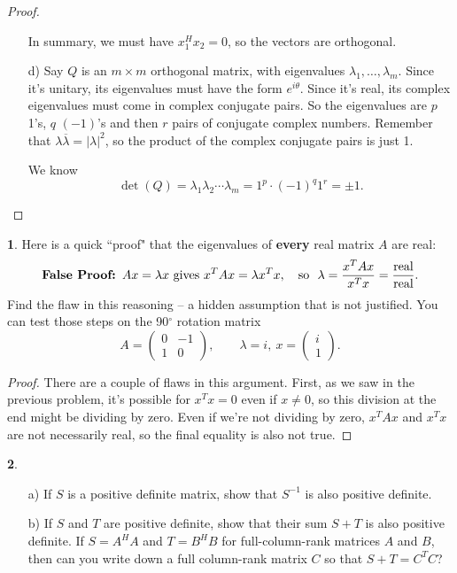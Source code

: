 \documentclass{article}
\theoremstyle{definition}
\newtheorem{prob}{}
\begin{document}
\begin{proof}
\begin{itemize}
	In summary, we must have $x_1^Hx_2=0$, so the vectors are orthogonal.
	
	\item[d)] Say $Q$ is an $m \times m$ orthogonal matrix, with eigenvalues $\lambda_1, \dots, \lambda_m$. Since it's unitary, its eigenvalues must have the form $e^{i \theta}$. Since it's real, its complex eigenvalues must come in complex conjugate pairs. So the eigenvalues are $p$ 1's, $q$ $(-1)$'s and then $r$ pairs of conjugate complex numbers. Remember that $\lambda \overline{\lambda}=|\lambda|^2$, so the product of the complex conjugate pairs is just 1.
	
	We know 
	\[\det(Q)= \lambda_1 \lambda_2 \cdots \lambda_m= 1^p \cdot (-1)^q 1^r= \pm1.\]
	\end{itemize}
\end{proof}

\begin{prob}
Here is a quick ``proof" that the eigenvalues of \textbf{every} real matrix $A$ are real:
\[\text{\textbf{False Proof: }} Ax = \lambda x \text{ gives } x^TAx = \lambda x^Tx, \quad \text{so } \ \lambda  = \frac{ x^TAx}{x^Tx} = \frac{\text{real}}{\text{real}}.\]
Find the flaw in this reasoning -- a hidden assumption that is not justified.  You can test those steps on the 90${}^\circ$ rotation matrix
\[ A = \begin{pmatrix} 0 & -1 \\  1 & 0 \end{pmatrix}, \qquad \lambda =  i, \ x = \begin{pmatrix} i \\ 1 \end{pmatrix}.\]
\end{prob}

\begin{proof}
There are a couple of flaws in this argument. First, as we saw in the previous problem, it's possible for $x^Tx=0$ even if $x \neq 0$, so this division at the end might be dividing by zero. Even if we're not dividing by zero, $x^TAx$ and $x^Tx$ are not necessarily real, so the final equality is also not true.
\end{proof}


\begin{prob}
\begin{itemize}
	\item[a)] If $S$ is a positive definite matrix, show that $S^{-1}$ is also positive definite.
	\item[b)] If $S$ and $T$ are positive definite, show that their sum $S + T$ is also positive definite.   If $S = A^HA$ and $T = B^HB$ for full-column-rank matrices $A$ and $B$, then can you write down a full column-rank matrix $C$ so that $S +T = C^TC$?
\end{itemize}
\end{prob}
\end{document}
